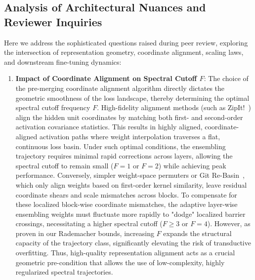 \subsection{Analysis of Architectural Nuances and Reviewer Inquiries}
\label{sec:appendix_nuances}

Here we address the sophisticated questions raised during peer review, exploring the intersection of representation geometry, coordinate alignment, scaling laws, and downstream fine-tuning dynamics:

\begin{enumerate}
    \item \textbf{Impact of Coordinate Alignment on Spectral Cutoff $F$}:
    The choice of the pre-merging coordinate alignment algorithm directly dictates the geometric smoothness of the loss landscape, thereby determining the optimal spectral cutoff frequency $F$. High-fidelity alignment methods (such as ZipIt!~\cite{stoica2023zipit}) align the hidden unit coordinates by matching both first- and second-order activation covariance statistics. This results in highly aligned, coordinate-aligned activation paths where weight interpolation traverses a flat, continuous loss basin. Under such optimal conditions, the ensembling trajectory requires minimal rapid corrections across layers, allowing the spectral cutoff to remain small ($F=1$ or $F=2$) while achieving peak performance. 
    Conversely, simpler weight-space permuters or Git Re-Basin~\cite{ainsworth2022git}, which only align weights based on first-order kernel similarity, leave residual coordinate shears and scale mismatches across blocks. To compensate for these localized block-wise coordinate mismatches, the adaptive layer-wise ensembling weights must fluctuate more rapidly to "dodge" localized barrier crossings, necessitating a higher spectral cutoff ($F \ge 3$ or $F=4$). However, as proven in our Rademacher bounds, increasing $F$ expands the structural capacity of the trajectory class, significantly elevating the risk of transductive overfitting. Thus, high-quality representation alignment acts as a crucial geometric pre-condition that allows the use of low-complexity, highly regularized spectral trajectories.


\end{enumerate}
